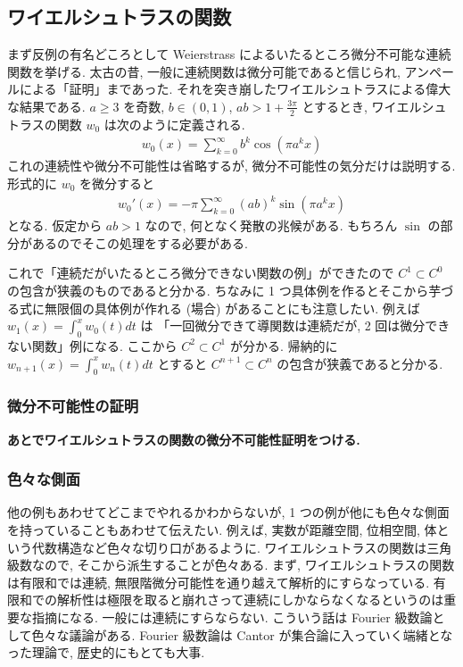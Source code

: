 \documentclass[openany, a4paper, oneside]{jsbook}
\begin{document}
\subsection{ワイエルシュトラスの関数}

まず反例の有名どころとして Weierstrass によるいたるところ微分不可能な連続関数を挙げる.
太古の昔, 一般に連続関数は微分可能であると信じられ, アンペールによる「証明」まであった.
それを突き崩したワイエルシュトラスによる偉大な結果である.
$a \geq 3$ を奇数, $b \in (0, 1)$, $ab > 1 + \frac{3 \pi}{2}$ とするとき,
ワイエルシュトラスの関数 $w_0$ は次のように定義される.
\begin{align}
 w_0 (x)
 =
 \sum_{k=0}^{\infty} b^k \cos (\pi a^k x)
\end{align}
これの連続性や微分不可能性は省略するが, 微分不可能性の気分だけは説明する.
形式的に $w_0$ を微分すると
\begin{align}
 w_0'(x)
 =
 -\pi \sum_{k=0}^{\infty} (ab)^k \sin (\pi a^k x)
\end{align}
となる.
仮定から $ab > 1$ なので, 何となく発散の兆候がある.
もちろん $\sin$ の部分があるのでそこの処理をする必要がある.

これで「連続だがいたるところ微分できない関数の例」ができたので $C^1 \subset C^0$ の包含が狭義のものであると分かる.
ちなみに 1 つ具体例を作るとそこから芋づる式に無限個の具体例が作れる (場合) があることにも注意したい.
例えば $w_1 (x)=\int_0^x w_0 (t) dt$ は
「一回微分できて導関数は連続だが, 2 回は微分できない関数」例になる.
ここから $C^2 \subset C^1$ が分かる.
帰納的に $w_{n+1}(x)=\int_0^x w_n (t) dt$ とすると $C^{n+1} \subset C^n$ の包含が狭義であると分かる.
\subsubsection{微分不可能性の証明}

\textbf{あとでワイエルシュトラスの関数の微分不可能性証明をつける.}
\subsubsection{色々な側面}

他の例もあわせてどこまでやれるかわからないが, 1 つの例が他にも色々な側面を持っていることもあわせて伝えたい.
例えば, 実数が距離空間, 位相空間, 体という代数構造など色々な切り口があるように.
ワイエルシュトラスの関数は三角級数なので, そこから派生することが色々ある.
まず, ワイエルシュトラスの関数は有限和では連続, 無限階微分可能性を通り越えて解析的にすらなっている.
有限和での解析性は極限を取ると崩れさって連続にしかならなくなるというのは重要な指摘になる.
一般には連続にすらならない.
こういう話は Fourier 級数論として色々な議論がある.
Fourier 級数論は Cantor が集合論に入っていく端緒となった理論で, 歴史的にもとても大事.
\end{document}
